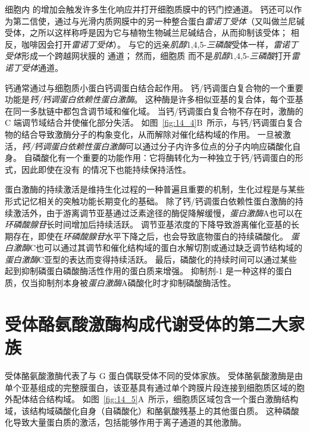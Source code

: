 细胞内  的增加会触发许多生化响应并打开细胞质膜中的钙门控通道。
钙还可以作为第二信使，通过与光滑内质网膜中的另一种整合蛋白\textit{雷诺丁受体}（又叫做兰尼碱受体，之所以这样称呼是因为它与植物生物碱兰尼碱结合，从而抑制该受体；
相反，咖啡因会打开\textit{雷诺丁受体}）。
与它的远亲\textit{肌醇}1,4,5-\textit{三磷酸}受体一样，\textit{雷诺丁受体}形成一个跨越网状膜的  通道；
然而，细胞质  而不是\textit{肌醇}1,4,5-\textit{三磷酸}打开\textit{雷诺丁受体}通道。


钙通常通过与细胞质小蛋白钙调蛋白结合起作用。
钙/钙调蛋白复合物的一个重要功能是\textit{钙/钙调蛋白依赖性蛋白激酶}。
这种酶是许多相似亚基的复合体，每个亚基在同一多肽链中都包含调节域和催化域。
当钙/钙调蛋白复合物不存在时，激酶的 C 端调节域结合并使催化部分失活。
如图~\ref{fig:14_4}B~所示，与钙/钙调蛋白复合物的结合导致激酶分子的构象变化，从而解除对催化结构域的作用。
一旦被激活，\textit{钙/钙调蛋白依赖性蛋白激酶}可以通过分子内许多位点的分子内响应磷酸化自身。
自磷酸化有一个重要的功能作用：它将酶转化为一种独立于钙/钙调蛋白的形式，因此即使在没有  的情况下也能持续保持活性。


蛋白激酶的持续激活是维持生化过程的一种普遍且重要的机制，生化过程是与某些形式记忆相关的突触功能长期变化的基础。
除了钙/钙调蛋白依赖性蛋白激酶的持续激活外，由于游离调节亚基通过泛素途径的酶促降解缓慢，\textit{蛋白激酶}A也可以在\textit{环磷酸腺苷}长时间增加后持续活跃。
调节亚基浓度的下降导致游离催化亚基的长期存在，即使在\textit{环磷酸腺苷}水平下降之后，也会导致底物蛋白的持续磷酸化。
\textit{蛋白激酶}C也可以通过其调节和催化结构域的蛋白水解切割或通过缺乏调节结构域的\textit{蛋白激酶}C亚型的表达而变得持续活跃。
最后，磷酸化的持续时间可以通过某些起到抑制磷蛋白磷酸酶活性作用的蛋白质来增强。
抑制剂-1 是一种这样的蛋白质，仅当抑制剂本身被\textit{蛋白激酶}A磷酸化时才抑制磷酸酶活性。



\section{受体酪氨酸激酶构成代谢受体的第二大家族}

受体酪氨酸激酶代表了与 G 蛋白偶联受体不同的受体家族。
受体酪氨酸激酶是由单个亚基组成的完整膜蛋白，该亚基具有通过单个跨膜片段连接到细胞质区域的胞外配体结合结构域。
如图~\ref{fig:14_5}A~所示，细胞质区域包含一个蛋白激酶结构域，该结构域磷酸化自身（自磷酸化）和酪氨酸残基上的其他蛋白质。
这种磷酸化导致大量蛋白质的激活，包括能够作用于离子通道的其他激酶。


